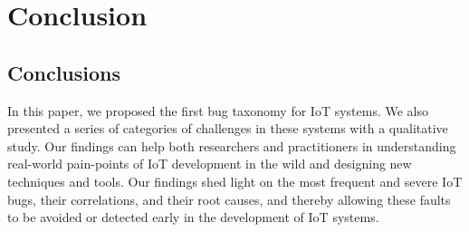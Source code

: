 
\chapter{Conclusion}
\label{ch:conclusion}

\section{Conclusions}
In this paper, we proposed the first bug taxonomy for IoT systems. We also presented a series of categories of challenges in these systems with a qualitative study. Our findings can help both researchers and practitioners in understanding real-world pain-points of IoT development in the wild and designing new techniques and tools. Our findings shed light on the most frequent and severe IoT bugs, their correlations, and their root causes, and thereby allowing these faults to be avoided or detected early in the development of IoT systems. 


\endinput

